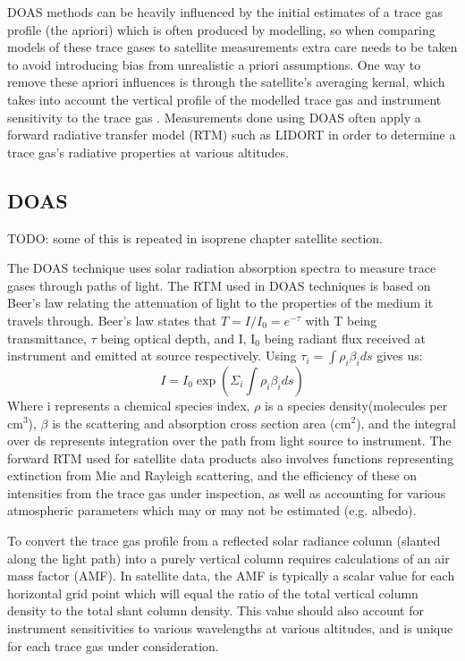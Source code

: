    DOAS methods can be heavily influenced by the initial estimates of a trace gas profile (the apriori) which is often produced by modelling, so when comparing models of these trace gases to satellite measurements extra care needs to be taken to avoid introducing bias from unrealistic a priori assumptions.
    One way to remove these apriori influences is through the satellite's averaging kernal, which takes into account the vertical profile of the modelled trace gas and instrument sensitivity to the trace gas \citep{Eskes2003, Palmer2001}.
    Measurements done using DOAS often apply a forward radiative transfer model (RTM) such as LIDORT in order to determine a trace gas's radiative properties at various altitudes.
  
  \subsection{DOAS}
    TODO: some of this is repeated in isoprene chapter satellite section.
    
    The DOAS technique uses solar radiation absorption spectra to measure trace gases through paths of light.
    The RTM used in DOAS techniques is based on Beer's law relating the attenuation of light to the properties of the medium it travels through.
    Beer's law states that $ T = I/I_0 = e^{-\tau} $ with T being transmittance, $\tau$ being optical depth, and I, I$_0$ being radiant flux received at instrument and emitted at source respectively.
    Using 
    $ \tau_i = \int \rho_i \beta_i ds $ gives us:
    $$ I = I_0 \exp {\left( \Sigma_i \int \rho_i \beta_i ds \right) } $$
    Where i represents a chemical species index, $\rho$ is a species density(molecules per cm$^3$), $\beta$ is the scattering and absorption cross section area (cm$^2$), and the integral over ds represents integration over the path from light source to instrument.
    The forward RTM used for satellite data products also involves functions representing extinction from Mie and Rayleigh scattering, and the efficiency of these on intensities from the trace gas under inspection, as well as accounting for various atmospheric parameters which may or may not be estimated (e.g. albedo).
    
    To convert the trace gas profile from a reflected solar radiance column (slanted along the light path) into a purely vertical column requires calculations of an air mass factor (AMF).
    In satellite data, the AMF is typically a scalar value for each horizontal grid point which will equal the ratio of the total vertical column density to the total slant column density. This value should also account for instrument sensitivities to various wavelengths at various altitudes, and is unique for each trace gas under consideration.
  
